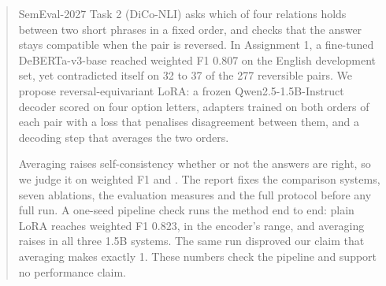\begin{abstract}
SemEval-2027 Task 2 (DiCo-NLI) asks which of four relations holds between two short phrases in a fixed order, and checks that the answer stays compatible when the pair is reversed. In Assignment 1, a fine-tuned DeBERTa-v3-base reached weighted F1 0.807 on the English development set, yet contradicted itself on 32 to 37 of the 277 reversible pairs. We propose reversal-equivariant LoRA: a frozen Qwen2.5-1.5B-Instruct decoder scored on four option letters, adapters trained on both orders of each pair with a loss that penalises disagreement between them, and a decoding step that averages the two orders.

Averaging raises self-consistency whether or not the answers are right, so we judge it on weighted F1 and \HardCons{}. The report fixes the comparison systems, seven ablations, the evaluation measures and the full protocol before any full run. A one-seed pipeline check runs the method end to end: plain LoRA reaches weighted F1 0.823, in the encoder's range, and averaging raises \HardCons{} in all three 1.5B systems. The same run disproved our claim that averaging makes \SoftCons{} exactly 1. These numbers check the pipeline and support no performance claim.
\end{abstract}
